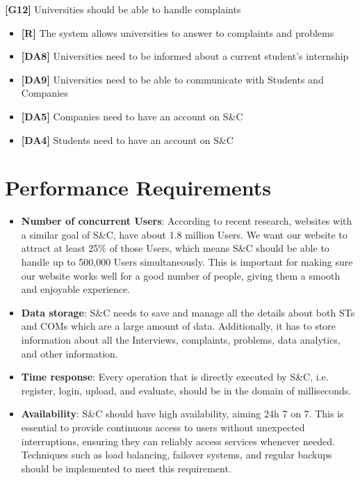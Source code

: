 \textbf{[G12]} Universities should be able to handle complaints
\begin{itemize}
    \item \textbf{[R]} The system allows universities to answer to complaints and problems
    
    \item \textbf{[DA8]} Universities need to be informed about a current student’s internship
    \item \textbf{[DA9]} Universities need to be able to communicate with Students and Companies
    \item \textbf{[DA5]} Companies need to have an account on S\&C
    \item \textbf{[DA4]} Students need to have an account on S\&C
\end{itemize}


\section{Performance Requirements}
\begin{itemize}
    \item \textbf{Number of concurrent Users}: According to recent research, websites with a similar goal of S\&C, have about 1.8 million Users. We want our website to attract at least 25\% of those Users, which means S\&C should be able to handle up to 500,000 Users simultaneously. This is important for making sure our website works well for a good number of people, giving them a smooth and enjoyable 
    experience.

    \item \textbf{Data storage}: S\&C needs to save and manage all the details about both STs and COMs which are a large amount of data. Additionally, it has to store information about all the Interviews, complaints, problems, data analytics, and other information.

    \item \textbf{Time response}: Every operation that is directly executed by S\&C, i.e. register, login, upload, and evaluate, should be in the domain of milliseconds. 

    \item \textbf{Availability}: S\&C should have high availability, aiming 24h 7 on 7. This is essential to provide continuous access to users without unexpected interruptions, ensuring they can reliably access services whenever needed. Techniques such as load balancing, failover systems, and regular backups should be implemented to meet this requirement.
    
\end{itemize}
 

